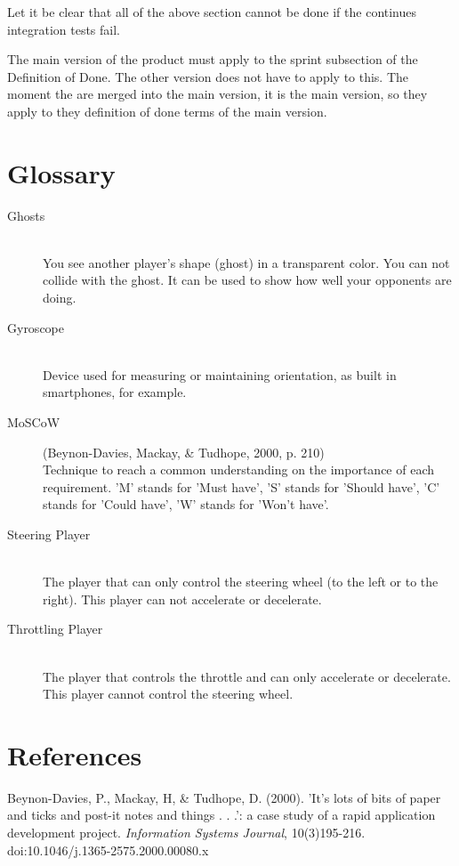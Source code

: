 \documentclass[11pt,twoside,a4paper]{article}
\begin{document}
Let it be clear that all of the above section cannot be done if the continues integration tests fail.

The main version of the product must apply to the sprint subsection of the Definition of Done. The other version does not have to apply to this. The moment the are merged into the main version, it is the main version, so they apply to they definition of done terms of the main version.


\newpage

\section{Glossary}

\begin{description}

\item[Ghosts] \hfill \\
You see another player's shape (ghost) in a transparent color. You can not collide with the ghost. It can be used to show how well your opponents are doing.

\item[Gyroscope] \hfill \\
Device used for measuring or maintaining orientation, as built in smartphones, for example.

\item[MoSCoW] (Beynon-Davies, Mackay, \& Tudhope, 2000, p. 210) \hfill \\
Technique to reach a common understanding on the importance of each requirement. 'M' stands for 'Must have', 'S' stands for 'Should have', 'C' stands for 'Could have', 'W' stands for 'Won't have'.

\item[Steering Player] \hfill \\
The player that can only control the steering wheel (to the left or to the right). This player can not accelerate or decelerate.

\item[Throttling Player] \hfill \\
The player that controls the throttle and can only accelerate or decelerate. This player cannot control the steering wheel.

\end{description}


\section*{References}
Beynon-Davies, P., Mackay, H, \& Tudhope, D. (2000). 'It's lots of bits of paper and ticks and post-it notes and things . . .': a case study of a rapid application development project. \emph{Information Systems Journal}, 10(3)195-216. doi:10.1046/j.1365-2575.2000.00080.x
\end{document}

